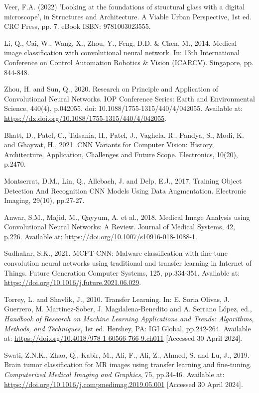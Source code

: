 \begin{thebibliography}{99}
    Veer, F.A. (2022) 'Looking at the foundations of structural glass with a digital microscope', in Structures and Architecture. A Viable Urban Perspective, 1st ed. CRC Press, pp. 7. eBook ISBN: 9781003023555.

    Li, Q., Cai, W., Wang, X., Zhou, Y., Feng, D.D. \& Chen, M., 2014. Medical image classification with convolutional neural network. In: 13th International Conference on Control Automation Robotics \& Vision (ICARCV). Singapore, pp. 844-848.

    Zhou, H. and Sun, Q., 2020. Research on Principle and Application of Convolutional Neural Networks. IOP Conference Series: Earth and Environmental Science, 440(4), p.042055. doi: 10.1088/1755-1315/440/4/042055. Available at: \url{https://dx.doi.org/10.1088/1755-1315/440/4/042055}.
    
    Bhatt, D., Patel, C., Talsania, H., Patel, J., Vaghela, R., Pandya, S., Modi, K. and Ghayvat, H., 2021. CNN Variants for Computer Vision: History, Architecture, Application, Challenges and Future Scope. Electronics, 10(20), p.2470.

    Montserrat, D.M., Lin, Q., Allebach, J. and Delp, E.J., 2017. Training Object Detection And Recognition CNN Models Using Data Augmentation. Electronic Imaging, 29(10), pp.27-27.

    Anwar, S.M., Majid, M., Qayyum, A. et al., 2018. Medical Image Analysis using Convolutional Neural Networks: A Review. Journal of Medical Systems, 42, p.226. Available at: \url{https://doi.org/10.1007/s10916-018-1088-1}.
 
    Sudhakar, S.K., 2021. MCFT-CNN: Malware classification with fine-tune convolution neural networks using traditional and transfer learning in Internet of Things. Future Generation Computer Systems, 125, pp.334-351. Available at: \url{https://doi.org/10.1016/j.future.2021.06.029}.

    Torrey, L. and Shavlik, J., 2010. Transfer Learning. In: E. Soria Olivas, J. Guerrero, M. Martinez-Sober, J. Magdalena-Benedito and A. Serrano López, ed., \textit{Handbook of Research on Machine Learning Applications and Trends: Algorithms, Methods, and Techniques}, 1st ed. Hershey, PA: IGI Global, pp.242-264. Available at: \url{https://doi.org/10.4018/978-1-60566-766-9.ch011} [Accessed 30 April 2024].

    Swati, Z.N.K., Zhao, Q., Kabir, M., Ali, F., Ali, Z., Ahmed, S. and Lu, J., 2019. Brain tumor classification for MR images using transfer learning and fine-tuning. \textit{Computerized Medical Imaging and Graphics}, 75, pp.34-46. Available at: \url{https://doi.org/10.1016/j.compmedimag.2019.05.001} [Accessed 30 April 2024].


\end{thebibliography}
